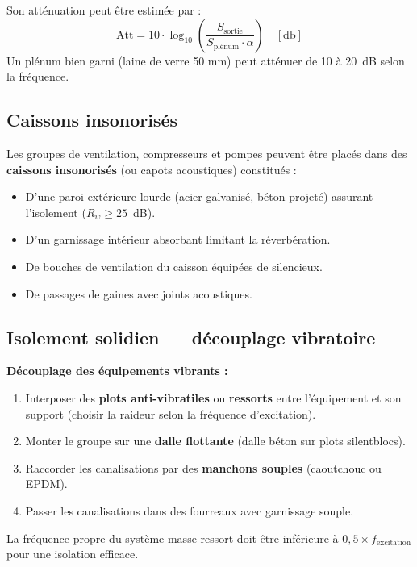 Son atténuation peut être estimée par :
\[
  \text{Att} = 10 \cdot \log_{10}\!\left(\frac{S_{\text{sortie}}}{S_{\text{plénum}} \cdot \bar{\alpha}}\right) \quad [\si{\decibel}]
\]
Un plénum bien garni (laine de verre 50 mm) peut atténuer de 10 à 20~dB selon la fréquence.

\subsection{Caissons insonorisés}

Les groupes de ventilation, compresseurs et pompes peuvent être placés dans des \textbf{caissons insonorisés} (ou capots acoustiques) constitués :
\begin{itemize}
  \item D'une paroi extérieure lourde (acier galvanisé, béton projeté) assurant l'isolement ($R_w \geq 25$~dB).
  \item D'un garnissage intérieur absorbant limitant la réverbération.
  \item De bouches de ventilation du caisson équipées de silencieux.
  \item De passages de gaines avec joints acoustiques.
\end{itemize}

\subsection{Isolement solidien — découplage vibratoire}

\begin{methode}
\textbf{Découplage des équipements vibrants :}
\begin{enumerate}
  \item Interposer des \textbf{plots anti-vibratiles} ou \textbf{ressorts} entre l'équipement et son support (choisir la raideur selon la fréquence d'excitation).
  \item Monter le groupe sur une \textbf{dalle flottante} (dalle béton sur plots silentblocs).
  \item Raccorder les canalisations par des \textbf{manchons souples} (caoutchouc ou EPDM).
  \item Passer les canalisations dans des fourreaux avec garnissage souple.
\end{enumerate}
La fréquence propre du système masse-ressort doit être inférieure à $0{,}5 \times f_{\text{excitation}}$ pour une isolation efficace.
\end{methode}

